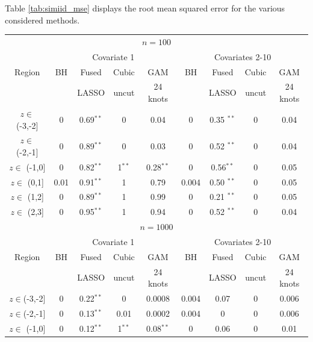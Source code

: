 Table \ref{tab:simiid_mse} displays the root mean squared error for the various considered methods.


\begin{table}
\begin{center}
\begin{tabular}{ccccccccc} %
\multicolumn{9}{c}{$n=100$} \\ %
& \multicolumn{4}{c}{Covariate 1} & \multicolumn{4}{c}{Covariates 2-10} \\ %
 Region          & BH  &  Fused       & Cubic       & GAM          & BH    &  Fused        & Cubic & GAM \\ 
                 &     &  LASSO       & uncut       & 24 knots   &       &  LASSO        & uncut & 24 knots \\ 
$z \in $ (-3,-2] & 0   &  0.69$^{**}$ &     0        &  0.04        & 0     &  0.35 $^{**}$ & 0     &  0.04 \\ 
$z \in $ (-2,-1] & 0   &  0.89$^{**}$ &     0        &  0.03        & 0     &  0.52 $^{**}$ & 0     &  0.04 \\ 
$z \in $  (-1,0] & 0   &  0.82$^{**}$ &     1$^{**}$ &  0.28$^{**}$  & 0     &  0.56$^{**}$  &  0     &  0.05 \\ 
$z \in $   (0,1] & 0.01&  0.91$^{**}$ &     1        &  0.79        & 0.004 &  0.50 $^{**}$ & 0     &   0.05\\ 
$z \in $   (1,2] & 0   &  0.89$^{**}$ &     1        &  0.99        & 0     &  0.21 $^{**}$ & 0     &   0.05\\ 
$z \in $   (2,3] & 0   &  0.95$^{**}$ &     1        &  0.94        & 0     &  0.52 $^{**}$ & 0     &  0.04 \\ 
\multicolumn{9}{c}{$n=1000$} \\ %
& \multicolumn{4}{c}{Covariate 1} & \multicolumn{4}{c}{Covariates 2-10} \\ %
 Region         & BH   & Fused        & Cubic  & GAM         & BH    &  Fused & Cubic    & GAM  \\ 
                &     &  LASSO        & uncut  & 24 knots  &       &  LASSO & uncut    & 24 knots \\ 
$z \in $(-3,-2] & 0    &  0.22$^{**}$ & 0       &  0.0008     & 0.004 &  0.07 & 0          & 0.006  \\ 
$z \in $(-2,-1] & 0    &  0.13$^{**}$ & 0.01    &  0.0002     & 0.004 &  0    & 0          & 0.006  \\ 
$z \in $ (-1,0] & 0    &  0.12$^{**}$ & 1$^{**}$ &  0.08$^{**}$& 0    &   0.06 &  0          & 0.01  \\ 

\end{tabular}
\end{center}
\end{table}

